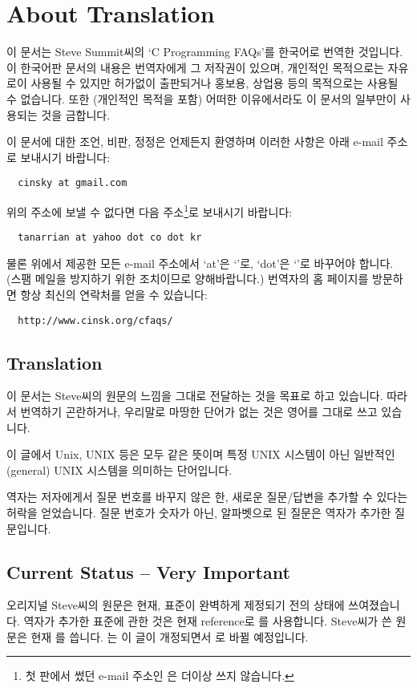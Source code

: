 \newpage

\section*{About Translation}
이 문서는 Steve Summit씨의 `C Programming FAQs'를 한국어로 번역한 것입니다.
이 한국어판 문서의 내용은 번역자에게 그 저작권이 있으며, 개인적인 목적으로는
자유로이 사용될 수 있지만 허가없이 출판되거나 홍보용, 상업용 등의 목적으로는
사용될 수 없습니다.  또한 (개인적인 목적을 포함) 어떠한 이유에서라도 이 문서의
일부만이 사용되는 것을 금합니다.

이 문서에 대한 조언, 비판, 정정은 언제든지 환영하며 이러한 사항은 아래
e-mail 주소로 보내시기 바랍니다:
\begin{verbatim}
  cinsky at gmail.com
\end{verbatim}

\noindent 위의 주소에 보낼 수 없다면 다음 주소\footnote{첫 판에서 썼던
e-mail 주소인 은 더이상 쓰지 않습니다.}로
보내시기 바랍니다:

\begin{verbatim}
  tanarrian at yahoo dot co dot kr
\end{verbatim}

물론 위에서 제공한 모든 e-mail 주소에서 `at'은 `'로, `dot'은
`'로 바꾸어야 합니다. 
(스팸 메일을 방지하기 위한 조치이므로 양해바랍니다.)
번역자의 홈 페이지를 방문하면 항상 최신의 연락처를 얻을 수 있습니다:

\begin{verbatim}
  http://www.cinsk.org/cfaqs/
\end{verbatim}

\subsection*{Translation}
이 문서는 Steve씨의 원문의 느낌을 그대로 전달하는 것을 목표로 하고 있습니다.
따라서 번역하기 곤란하거나, 우리말로 마땅한 단어가 없는 것은 영어를
그대로 쓰고 있습니다.

이 글에서 Unix, UNIX 등은 모두 같은 뜻이며 특정 UNIX 시스템이 아닌
일반적인(general) UNIX 시스템을 의미하는 단어입니다.  

역자는 저자에게서 질문 번호를 바꾸지 않은 한, 새로운 질문/답변을 추가할 수
있다는 허락을 얻었습니다.  질문 번호가 숫자가 아닌, 알파벳으로 된 질문은
역자가 추가한 질문입니다.

\subsection*{Current Status -- Very Important}
오리지널 Steve씨의 원문은 현재, \cite{c99} 표준이 완벽하게 제정되기 전의
상태에 쓰여졌습니다. 역자가 추가한 \cite{c99} 표준에 관한 것은 현재 
reference로 \cite{c99}를 사용합니다. Steve씨가 쓴 원문은 현재 \cite{c9x}를
씁니다. \cite{c9x}는 이 글이 개정되면서 \cite{c99}로 바뀔 예정입니다.

